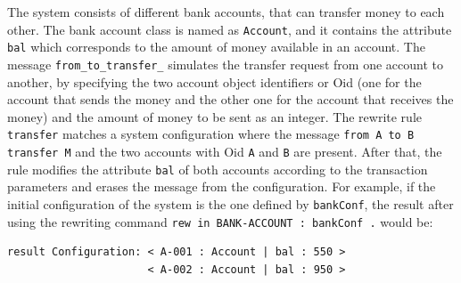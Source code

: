 The system consists of different bank accounts, that can transfer money to each other. The bank account class is named as \texttt{Account}, and it contains the attribute \texttt{bal} which corresponds to the amount of money available in an account. The message \texttt{from\_to\_transfer\_} simulates the transfer request from one account to another, by specifying the two account object identifiers or Oid (one for the account that sends the money and the other one for the account that receives the money) and the amount of money to be sent as an integer. The rewrite rule \texttt{transfer} matches a system configuration where the message \texttt{from A to B transfer M} and the two accounts with Oid \texttt{A} and \texttt{B} are present. After that, the rule modifies the attribute \texttt{bal} of both accounts according to the transaction parameters and erases the message from the configuration. For example, if the initial configuration of the system is the one defined by \texttt{bankConf}, the result after using the rewriting command \texttt{rew in BANK-ACCOUNT : bankConf .} would be:
\begin{lstlisting}
result Configuration: < A-001 : Account | bal : 550 > 
                      < A-002 : Account | bal : 950 >
\end{lstlisting}

